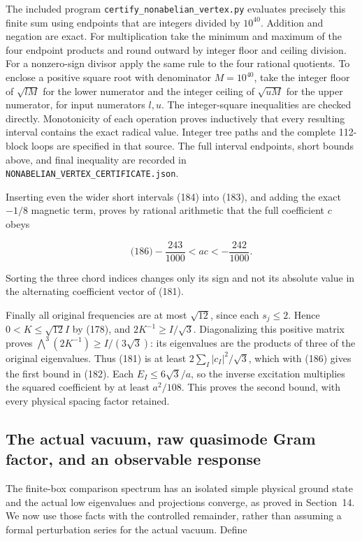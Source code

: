 The included program \texttt{certify\_nonabelian\_vertex.py} evaluates
precisely this finite sum using endpoints that are integers divided by
\(10^{40}\). Addition and negation are exact. For multiplication take
the minimum and maximum of the four endpoint products and round outward
by integer floor and ceiling division. For a nonzero-sign divisor apply
the same rule to the four rational quotients. To enclose a positive
square root with denominator \(M=10^{40}\), take the integer floor of
\(\sqrt{lM}\) for the lower numerator and the integer ceiling of
\(\sqrt{uM}\) for the upper numerator, for input numerators \(l,u\). The
integer-square inequalities are checked directly. Monotonicity of each
operation proves inductively that every resulting interval contains the
exact radical value. Integer tree paths and the complete 112-block loops
are specified in that source. The full interval endpoints, short bounds
above, and final inequality are recorded in
\texttt{NONABELIAN\_VERTEX\_CERTIFICATE.json}.

Inserting even the wider short intervals (184) into (183), and adding
the exact \(-1/8\) magnetic term, proves by rational arithmetic that the
full coefficient \(c\) obeys

\[
\qquad\text{(186)}
 -\frac{243}{1000}<ac<-\frac{242}{1000}.
\]

Sorting the three chord indices changes only its sign and not its
absolute value in the alternating coefficient vector of (181).

Finally all original frequencies are at most \(\sqrt{12}\), since each
\(s_j\le2\). Hence \(0<K\le\sqrt{12}I\) by (178), and
\(2K^{-1}\ge I/\sqrt3\). Diagonalizing this positive matrix proves
\(\bigwedge^3(2K^{-1})\ge I/(3\sqrt3)\): its eigenvalues are the
products of three of the original eigenvalues. Thus (181) is at least
\(2\sum_I|c_I|^2/\sqrt3\), which with (186) gives the first bound in
(182). Each \(E_I\le6\sqrt3/a\), so the inverse excitation multiplies
the squared coefficient by at least \(a^2/108\). This proves the second
bound, with every physical spacing factor retained.

\subsection{The actual vacuum, raw quasimode Gram factor, and an
observable
response}\label{nonabelian-vertex-md-the-actual-vacuum-raw-quasimode-gram-factor-and-an-observable-response}

The finite-box comparison spectrum has an isolated simple physical
ground state and the actual low eigenvalues and projections converge, as
proved in Section~14. We now use those facts with the controlled
remainder, rather than assuming a formal perturbation series for the
actual vacuum. Define

